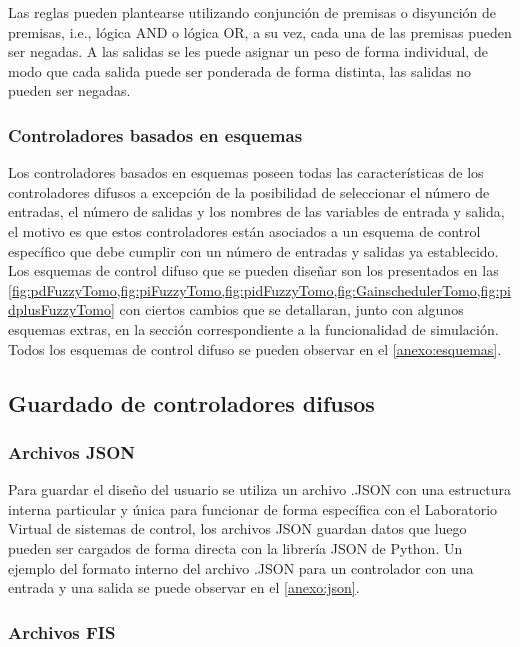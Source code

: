                 Las reglas pueden plantearse utilizando conjunción de premisas o disyunción de premisas, i.e., lógica AND o lógica OR, a su vez, cada una de las premisas pueden ser negadas. A las salidas se les puede asignar un peso de forma individual, de modo que cada salida puede ser ponderada de forma distinta, las salidas no pueden ser negadas.

        \subsubsection{Controladores basados en esquemas}

            Los controladores basados en esquemas poseen todas las características de los controladores difusos a excepción de la posibilidad de seleccionar el número de entradas, el número de salidas y los nombres de las variables de entrada y salida, el motivo es que estos controladores están asociados a un esquema de control específico que debe cumplir con un número de entradas y salidas ya establecido. Los esquemas de control difuso que se pueden diseñar son los presentados en las \cref{fig:pdFuzzyTomo,fig:piFuzzyTomo,fig:pidFuzzyTomo,fig:GainschedulerTomo,fig:pidplusFuzzyTomo} con ciertos cambios que se detallaran, junto con algunos esquemas extras, en la sección correspondiente a la funcionalidad de simulación. Todos los esquemas de control difuso se pueden observar en el \ref{anexo:esquemas}.    

    \subsection{Guardado de controladores difusos}

        \subsubsection{Archivos JSON}
        
            Para guardar el diseño del usuario se utiliza un archivo .JSON con una estructura interna particular y única para funcionar de forma específica con el Laboratorio Virtual de sistemas de control, los archivos JSON guardan datos que luego pueden ser cargados de forma directa con la librería JSON de Python. Un ejemplo del formato interno del archivo .JSON para un controlador con una entrada y una salida se puede observar en el \ref{anexo:json}.

        \subsubsection{Archivos FIS}

